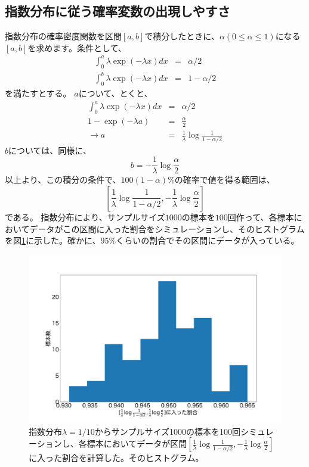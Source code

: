 \subsection{指数分布に従う確率変数の出現しやすさ}
指数分布の確率密度関数を区間$[a,b]$で積分したときに、$\alpha(0\leq \alpha \leq 1)$になる$[a,b]$を求めます。条件として、
\begin{eqnarray*}
    \int_0^{a}  \lambda\exp(-\lambda x )dx &=& \alpha/2\\
    \int_0^{b} \lambda\exp(-\lambda x )dx &=& 1-\alpha/2
\end{eqnarray*}
を満たすとする。
$a$について、とくと、
\begin{eqnarray*}
    \int_0^{a}  \lambda\exp(-\lambda x )dx &=& \alpha/2\\
     1-\exp(-\lambda a) &=& \frac{\alpha}{2}\\
     \rightarrow a&=& \frac{1}{\lambda} \log\frac{1}{1-\alpha/2}
\end{eqnarray*}
$b$については、同様に、
\begin{equation*}
    b = -\frac{1}{\lambda}\log\frac{\alpha}{2}
\end{equation*}
以上より、この積分の条件で、$100(1-\alpha)\%$の確率で値を得る範囲は、
\begin{equation}\label{expon_fail_prediction_interval}
 \left[ \frac{1}{\lambda} \log\frac{1}{1-\alpha/2},
-\frac{1}{\lambda}\log\frac{\alpha}{2} \right]
\end{equation}
である。
指数分布により、サンプルサイズ$1000$の標本を$100$回作って、各標本においてデータがこの区間に入った割合をシミュレーションし、そのヒストグラムを図\ref{fig:expon_simulation_sample}に示した。確かに、$95\%$くらいの割合でその区間にデータが入っている。

\begin{figure}
    \begin{center}
        \includegraphics[width=15cm]{./image/02_/expon_simulation_sample.pdf}
        \caption{指数分布$\lambda=1/10$からサンプルサイズ1000の標本を100回シミュレーションし、各標本においてデータが区間$[\frac{1}{\lambda} \log\frac{1}{1-\alpha/2} ,-\frac{1}{\lambda}\log\frac{\alpha}{2}]$に入った割合を計算した。そのヒストグラム。}
        \label{fig:expon_simulation_sample}

    \end{center}
\end{figure}


